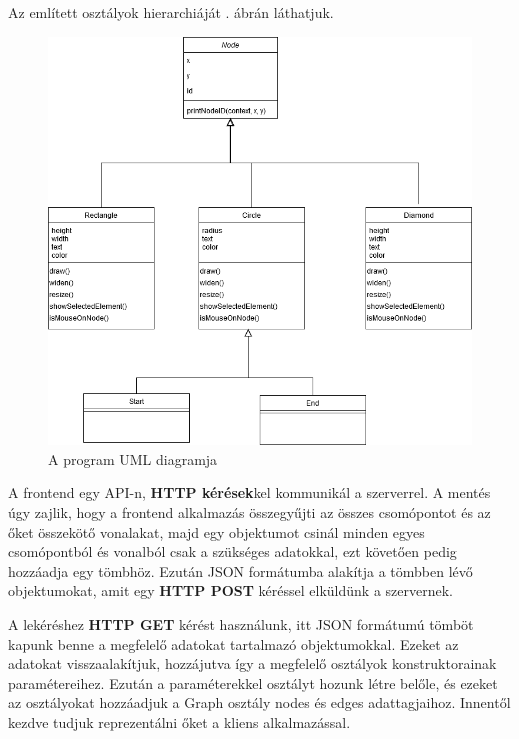 Az említett osztályok hierarchiáját . ábrán láthatjuk.
 
\begin{figure}[h!]
\centering
\includegraphics[scale=0.5]{images/umldiagram.png}
\caption{A program UML diagramja}
\label{fig:uml}
\end{figure}

A frontend egy API-n, \textbf{HTTP kérések}kel kommunikál a szerverrel. A mentés úgy zajlik, hogy a frontend alkalmazás összegyűjti az összes csomópontot és az őket összekötő vonalakat, majd egy objektumot csinál minden egyes csomópontból és vonalból csak a szükséges adatokkal, ezt követően pedig hozzáadja egy tömbhöz. Ezután JSON formátumba alakítja a tömbben lévő objektumokat, amit egy \textbf{HTTP POST} kéréssel elküldünk a szervernek.

A lekéréshez \textbf{HTTP GET} kérést használunk, itt JSON formátumú tömböt kapunk benne a megfelelő adatokat tartalmazó objektumokkal. Ezeket az adatokat visszaalakítjuk, hozzájutva így a megfelelő osztályok konstruktorainak paramétereihez. Ezután a paraméterekkel osztályt hozunk létre belőle, és ezeket az osztályokat hozzáadjuk a Graph osztály nodes és edges adattagjaihoz. Innentől kezdve tudjuk reprezentálni őket a kliens alkalmazással.